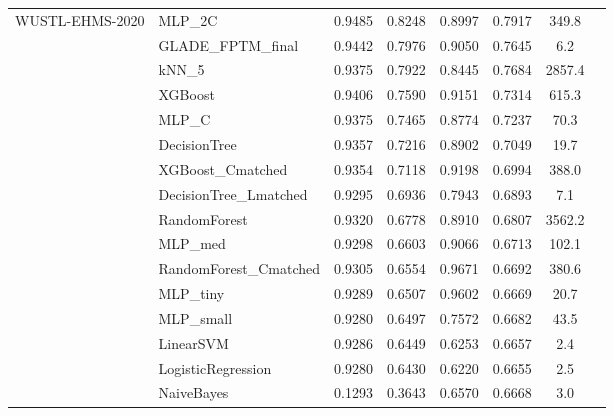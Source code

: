 \documentclass[journal,10pt]{IEEEtran}
\begin{document}
\begin{longtable}{llcccccr}
\multirow{16}{*}{WUSTL-EHMS-2020}
 & MLP\_2C                & 0.9485 & 0.8248 & 0.8997 & 0.7917 & 349.8   \\
 & GLADE\_FPTM\_final     & 0.9442 & 0.7976 & 0.9050 & 0.7645 & 6.2     \\
 & kNN\_5                 & 0.9375 & 0.7922 & 0.8445 & 0.7684 & 2857.4  \\
 & XGBoost                & 0.9406 & 0.7590 & 0.9151 & 0.7314 & 615.3   \\
 & MLP\_C                 & 0.9375 & 0.7465 & 0.8774 & 0.7237 & 70.3    \\
 & DecisionTree           & 0.9357 & 0.7216 & 0.8902 & 0.7049 & 19.7    \\
 & XGBoost\_Cmatched      & 0.9354 & 0.7118 & 0.9198 & 0.6994 & 388.0   \\
 & DecisionTree\_Lmatched & 0.9295 & 0.6936 & 0.7943 & 0.6893 & 7.1     \\
 & RandomForest           & 0.9320 & 0.6778 & 0.8910 & 0.6807 & 3562.2  \\
 & MLP\_med               & 0.9298 & 0.6603 & 0.9066 & 0.6713 & 102.1   \\
 & RandomForest\_Cmatched & 0.9305 & 0.6554 & 0.9671 & 0.6692 & 380.6   \\
 & MLP\_tiny              & 0.9289 & 0.6507 & 0.9602 & 0.6669 & 20.7    \\
 & MLP\_small             & 0.9280 & 0.6497 & 0.7572 & 0.6682 & 43.5    \\
 & LinearSVM              & 0.9286 & 0.6449 & 0.6253 & 0.6657 & 2.4     \\
 & LogisticRegression     & 0.9280 & 0.6430 & 0.6220 & 0.6655 & 2.5     \\
 & NaiveBayes             & 0.1293 & 0.3643 & 0.6570 & 0.6668 & 3.0     \\

\end{longtable}
\twocolumn
\end{document}
